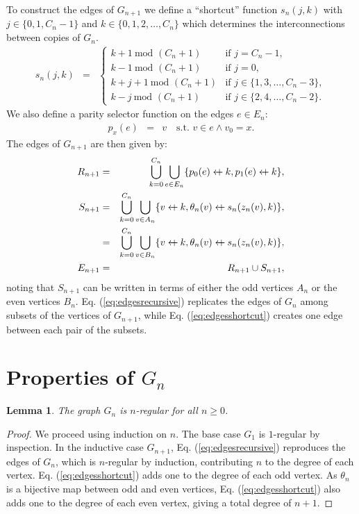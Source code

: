 \documentclass{article}
\newcommand{\beq}{\begin{eqnarray}}
\newcommand{\eeq}{\end{eqnarray}}
\newcommand{\append}{\leftarrow{\mkern-18mu}{+}\:}
\newtheorem{lemma}{Lemma}
\begin{document}
To construct the edges of $G_{n+1}$ we define a ``shortcut'' function $s_n(j, k)$
with $j \in \{0, 1, C_n - 1\}$ and $k \in \{0, 1, 2, \ldots, C_n\}$ which
determines the interconnections between copies of $G_n$.
\beq
\label{eq:shortcut}
s_{n}(j, k)
&=&
\begin{cases}
k + 1 \ \mbox{mod } (C_n + 1)
&
\mbox{if } j = C_n - 1,
\\
k - 1 \ \mbox{mod } (C_n + 1)
&
\mbox{if } j = 0,
\\
k + j + 1 \ \mbox{mod } (C_n + 1)
&
\mbox{if } j \in \{1, 3, \ldots, C_n - 3\},
\\
k - j \ \mbox{mod } (C_n + 1)
&
\mbox{if } j \in \{2, 4, \ldots, C_n - 2\}.
\end{cases}
\eeq
We also define a parity selector function on the edges $e \in E_n$:
\beq
p_x(e)
&=&
v \quad \mbox{s.t. } v \in e \land v_0 = x.
\eeq
The edges of $G_{n+1}$ are then given by:
\beq
\label{eq:edgesrecursive}
R_{n+1}
&=&
\bigcup_{k=0}^{C_n}
\bigcup_{e \in E_n} \{ p_0(e) \append k, p_1(e) \append k\},
\\
\label{eq:edgesshortcut}
S_{n+1}
&=&
\bigcup_{k=0}^{C_n}
\bigcup_{v \in A_n} \{ v \append k, \theta_n(v) \append s_n(z_n(v), k) \},
\\
&=&
\bigcup_{k=0}^{C_n}
\bigcup_{v \in B_n} \{ v \append k, \theta_n(v) \append s_n(z_n(v), k) \},
\\
E_{n+1}
&=&
R_{n+1} \cup S_{n+1},
\eeq
noting that $S_{n+1}$ can be written in terms of either the odd vertices $A_n$
or the even vertices $B_n$.
Eq. (\ref{eq:edgesrecursive}) replicates the edges of
$G_n$ among subsets of the vertices of $G_{n+1}$,
while Eq. (\ref{eq:edgesshortcut})
creates one edge between each pair of the subsets.

\section{Properties of $G_n$}

\begin{lemma}
\label{lem:regular}
The graph $G_n$ is $n$-regular for all $n \geq 0$.
\end{lemma}
\begin{proof}
We proceed using induction on $n$.
The base case $G_1$ is $1$-regular by inspection.
In the inductive case $G_{n+1}$,
Eq. (\ref{eq:edgesrecursive})
reproduces the edges of $G_n$,
which is $n$-regular by induction,
contributing $n$ to the degree of each vertex.
Eq. (\ref{eq:edgesshortcut}) adds one to the degree of each odd vertex.
As $\theta_n$ is a bijective map between odd and even vertices,
Eq. (\ref{eq:edgesshortcut}) also adds one to the degree of each even vertex,
giving a total degree of $n + 1$.
\end{proof}
\end{document}
